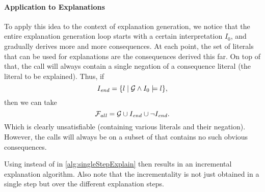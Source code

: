 \paragraph{Application to Explanations}
To apply this idea to the context of explanation generation, we notice that the entire explanation generation loop starts with a certain interpretation $I_0$, and gradually derives more and more consequences.
At each point, the set of literals that can be used for explanations are the consequences derived this far. On top of that, the \omus call will always contain a single negation of a consequence literal (the literal to be explained). 
Thus, if 
\[I_{\mathit{end}} = \{ l\mid \mathcal{G}  \land I_0 \models l\},\]
then we can take 
\[\mathcal{F} _{\mathit{all}} = \mathcal{G}  \cup I_{\mathit{end}} \cup \lnot I_{\mathit{end}}.\]
Which is clearly unsatisfiable (containing various literals and their negation). However, the \omus calls will always be on a subset of \fall that contains no such obvious consequences. 

Using \omusinc instead of \omus in \cref{alg:singleStepExplain}  then results in an incremental explanation algorithm. Also note that the incrementality is not just obtained in a single step but over the different explanation steps. 
% 
% 
% 
% 

